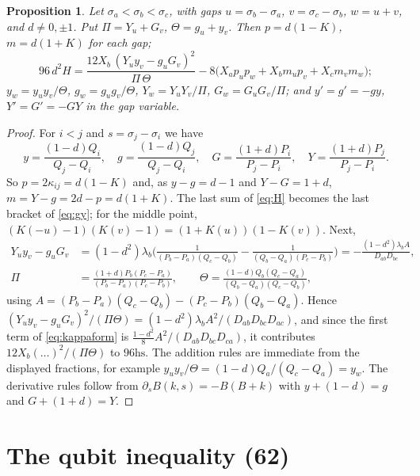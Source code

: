 \documentclass[11pt]{amsart}
\newtheorem{proposition}[theorem]{Proposition}
\theoremstyle{definition}
\numberwithin{equation}{section}
\newcommand{\hs}{\mathrm{hs}}
\begin{document}
\begin{proposition}\label{prop:gy}
Let $\sigma_a<\sigma_b<\sigma_c$, with gaps $u=\sigma_b-\sigma_a$, $v=\sigma_c-\sigma_b$, $w=u+v$, and $d\ne0,\pm1$. Put $\Pi=Y_u+G_v$, $\Theta=g_u+y_v$. Then $p=d(1-K)$, $m=d(1+K)$ for each gap;
\begin{equation}\label{eq:gy}
96\,d^2H=\frac{12X_b\,(Y_uy_v-g_uG_v)^2}{\Pi\,\Theta}-8\big(X_ap_up_w+X_bm_up_v+X_cm_vm_w\big);
\end{equation}
$y_w=y_uy_v/\Theta$, $g_w=g_ug_v/\Theta$, $Y_w=Y_uY_v/\Pi$, $G_w=G_uG_v/\Pi$; and $y'=g'=-gy$, $Y'=G'=-GY$ in the gap variable.
\end{proposition}
\begin{proof}
For $i<j$ and $s=\sigma_j-\sigma_i$ we have
\[y=\frac{(1-d)Q_i}{Q_j-Q_i},\quad g=\frac{(1-d)Q_j}{Q_j-Q_i},\quad G=\frac{(1+d)P_i}{P_j-P_i},\quad Y=\frac{(1+d)P_j}{P_j-P_i}.\]
So $p=2\kappa_{ij}=d(1-K)$ and, as $y-g=d-1$ and $Y-G=1+d$, $m=Y-g=2d-p=d(1+K)$. The last sum of \eqref{eq:H} becomes the last bracket of \eqref{eq:gy}; for the middle point,
$(K(-u)-1)(K(v)-1)=(1+K(u))(1-K(v))$. Next,
\begin{align*}
Y_uy_v-g_uG_v&=(1-d^2)\lambda_b\Big(\frac1{(P_b-P_a)(Q_c-Q_b)}-\frac1{(Q_b-Q_a)(P_c-P_b)}\Big)=-\frac{(1-d^2)\lambda_bA}{D_{ab}D_{bc}},\\
\Pi&=\frac{(1+d)P_b(P_c-P_a)}{(P_b-P_a)(P_c-P_b)},\qquad\Theta=\frac{(1-d)Q_b(Q_c-Q_a)}{(Q_b-Q_a)(Q_c-Q_b)},
\end{align*}
using $A=(P_b-P_a)(Q_c-Q_b)-(P_c-P_b)(Q_b-Q_a)$. Hence $(Y_uy_v-g_uG_v)^2/(\Pi\Theta)=(1-d^2)\lambda_bA^2/(D_{ab}D_{bc}D_{ac})$, and since the first term of \eqref{eq:kappaform} is
$\frac{1-d^2}8A^2/(D_{ab}D_{bc}D_{ca})$, it contributes $12X_b(\dots)^2/(\Pi\Theta)$ to $96\hs$. The addition rules are immediate from the displayed fractions, for example
$y_uy_v/\Theta=(1-d)Q_a/(Q_c-Q_a)=y_w$. The derivative rules follow from $\partial_sB(k,s)=-B(B+k)$ with $y+(1-d)=g$ and $G+(1+d)=Y$.
\end{proof}

\section{The qubit inequality (62)}
\end{document}
